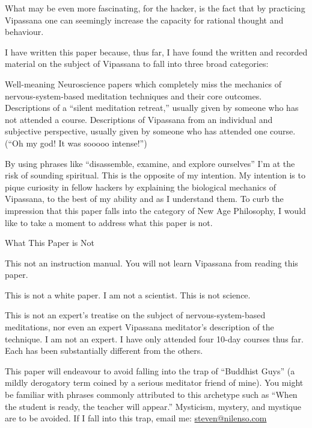 \documentclass{article}
\begin{document}
What may be even more fascinating, for the hacker, is the fact that by practicing Vipassana one can seemingly increase the capacity for rational thought and behaviour.

I have written this paper because, thus far, I have found the written and recorded material on the subject of Vipassana to fall into three broad categories:

Well-meaning Neuroscience papers which completely miss the mechanics of nervous-system-based meditation techniques and their core outcomes.
Descriptions of a ``silent meditation retreat,'' usually given by someone who has not attended a course. \cite{thenewsroom}
Descriptions of Vipassana from an individual and subjective perspective, usually given by someone who has attended one course. (``Oh my god! It was sooooo intense!'')

By using phrases like ``disassemble, examine, and explore ourselves'' I'm at the risk of sounding spiritual. This is the opposite of my intention. My intention is to pique curiosity in fellow hackers by explaining the biological mechanics of Vipassana, to the best of my ability and as I understand them. To curb the impression that this paper falls into the category of New Age Philosophy, I would like to take a moment to address what this paper is not.

\pagebreak

\begin{center}
  \Huge{What This Paper is Not}
\end{center}


This not an instruction manual. You will not learn Vipassana from reading this paper.

This is not a white paper. I am not a scientist. This is not science.

This is not an expert's treatise on the subject of nervous-system-based meditations, nor even an expert Vipassana meditator's description of the technique. I am not an expert. I have only attended four 10-day courses thus far. Each has been substantially different from the others.

This paper will endeavour to avoid falling into the trap of ``Buddhist Guys'' (a mildly derogatory term coined by a serious meditator friend of mine). You might be familiar with phrases commonly attributed to this archetype such as ``When the student is ready, the teacher will appear.'' Mysticism, mystery, and mystique are to be avoided. If I fall into this trap, email me: \href{mailto:steven@nilenso.com}{steven@nilenso.com}
\end{document}
